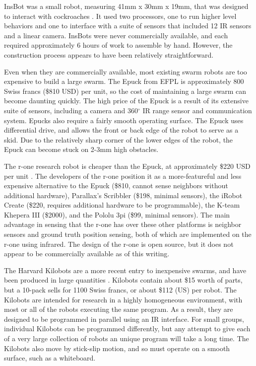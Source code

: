 InsBot was a small robot, measuring 41mm x 30mm x 19mm, that was designed to interact with cockroaches \citep{colot2004insbot}.
It used two processors, one to run higher level behaviors and one to interface with a suite of sensors that included 12 IR sensors and a linear camera. 
InsBots were never commercially available, and each required approximately 6 hours of work to assemble by hand. 
However, the construction process appears to have been relatively straightforward. 

Even when they are commercially available, most existing swarm robots are too expensive to build a large swarm.
The Epuck from EFPL is approximately 800 Swiss francs (\$810 USD) per unit, so the cost of maintaining a large swarm can become daunting quickly. 
The high price of the Epuck is a result of its extensive suite of sensors, including a camera and 360$^{\circ}$ IR range sensor and communication system. 
Epucks also require a fairly smooth operating surface.
The Epuck uses differential drive, and allows the front or back edge of the robot to serve as a skid. 
Due to the relatively sharp corner of the lower edges of the robot, the Epuck can become stuck on 2-3mm high obstacles. 

The r-one research robot is cheaper than the Epuck, at approximately \$220 USD per unit \citep{mclurkin2013low}. 
The developers of the r-one position it as a more-featureful and less expensive alternative to the Epuck (\$810, cannot sense neighbors without additional hardware), Parallax's Scribbler (\$198, minimal sensors), the iRobot Create (\$220, requires additional hardware to be programmable), the K-team Khepera III (\$2000), and the Pololu 3pi (\$99, minimal sensors). The main advantage in sensing that the r-one has over these other platforms is neighbor sensors and ground truth position sensing, both of which are implemented on the r-one using infrared.
The design of the r-one is open source, but it does not appear to be commercially available as of this writing.   

The Harvard Kilobots are a more recent entry to inexpensive swarms, and have been produced in large quantities \citep{rubenstein2014kilobot}. 
Kilobots contain about \$15 worth of parts, but a 10-pack sells for 1100 Swiss francs, or about \$112 (US) per robot. 
The Kilobots are intended for research in a highly homogeneous environment, with most or all of the robots executing the same program. 
As a result, they are designed to be programmed in parallel using an IR interface. 
For small groups, individual Kilobots can be programmed differently, but any attempt to give each of a very large collection of robots an unique program will take a long time. 
The Kilobots also move by stick-slip motion, and so must operate on a smooth surface, such as a whiteboard. 

